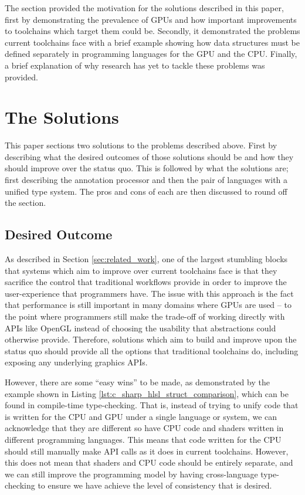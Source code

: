 \documentclass[a4paper,12pt,twoside,openright]{report}
\begin{document}
The section provided the motivation for the solutions described in this paper,
first by demonstrating the prevalence of GPUs and how important improvements to
toolchains which target them could be. Secondly, it demonstrated the problems
current toolchains face with a brief example showing how data structures must be
defined separately in programming languages for the GPU and the CPU. Finally, a
brief explanation of why research has yet to tackle these problems was
provided.

\section{The Solutions}

This paper sections two solutions to the problems described above. First by
describing what the desired outcomes of those solutions should be and how they
should improve over the status quo. This is followed by what the solutions are;
first describing the annotation processor and then the pair of languages with a
unified type system. The pros and cons of each are then discussed to round off
the section.

\subsection{Desired Outcome}

As described in Section \ref{sec:related_work}, one of the largest stumbling
blocks that systems which aim to improve over current toolchains face is that
they sacrifice the control that traditional workflows provide in order to
improve the user-experience that programmers have. The issue with this approach
is the fact that performance is still important in many domains where GPUs are
used -- to the point where programmers still make the trade-off of working
directly with APIs like OpenGL instead of choosing the usability that
abstractions could otherwise provide. Therefore, solutions which aim to build
and improve upon the status quo should provide all the options that traditional
toolchains do, including exposing any underlying graphics APIs.

However, there are some ``easy wins'' to be made, as demonstrated by the
example shown in Listing \ref{lst:c_sharp_hlsl_struct_comparison}, which can be
found in compile-time type-checking. That is, instead of trying to unify code
that is written for the CPU and GPU under a single language or system, we can
acknowledge that they are different so have CPU code and shaders written in
different programming languages. This means that code written for the CPU
should still manually make API calls as it does in current toolchains. However,
this does not mean that shaders and CPU code should be entirely separate, and
we can still improve the programming model by having cross-language
type-checking to ensure we have achieve the level of consistency that is
desired.
\end{document}
